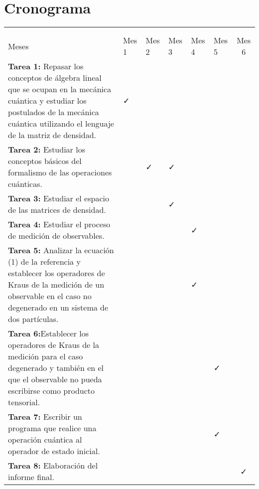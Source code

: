 \section{Cronograma}


\begin{table}[H]
	\begin{center}
		
	\begin{tabular}{|>{\arraybackslash}m{6cm}|>{\centering}m{1cm}|>{\centering}m{1cm}|>{\centering}m{1cm}|>{\centering}m{1cm}|>{\centering}m{1cm}|c|}
		\hline
		
		\diagbox[width=18em]{  Tareas\\ }{ \\ Meses}&
		 Mes 1& Mes 2&Mes 3&Mes 4 &Mes 5&Mes 6 \\ \hline \hline
		\textbf{Tarea 1:} Repasar los conceptos de álgebra lineal que se ocupan en la mecánica cuántica y estudiar los postulados de la mecánica cuántica utilizando el lenguaje de la matriz de densidad.&\faCheck & & & & & \\ \hline
		\textbf{Tarea 2:} Estudiar los conceptos básicos del formalismo de las operaciones cuánticas.&&\faCheck&\faCheck&&& \\ \hline
		\textbf{Tarea 3:} Estudiar el espacio de las matrices de densidad.&&&\faCheck&&&\\ \hline
		\textbf{Tarea 4:} Estudiar el proceso de medición de observables. &                          & &  & \faCheck &  &                          \\ \hline
		\textbf{Tarea 5:} Analizar la ecuación (1) de la referencia \cite{Pineda_2021} y establecer los operadores de Kraus de la medición de un observable en el caso no degenerado en un sistema de dos partículas. &                          &  & &\faCheck   &  &                          \\ \hline
		\textbf{Tarea 6:}Establecer los operadores de Kraus de la medición para el caso degenerado y también en el que el observable no pueda escribirse como producto tensorial.&                          &                          &  & &\faCheck   &                          \\ \hline
		\textbf{Tarea 7:} Escribir un programa que realice una operación cuántica al operador de estado inicial. &                          &                          &  &  & \faCheck &                          \\ \hline
		\textbf{Tarea 8:} Elaboración del informe final.&                          &                          &  &  &  &\faCheck  \\ \hline
	\end{tabular}

	\end{center}

\end{table}